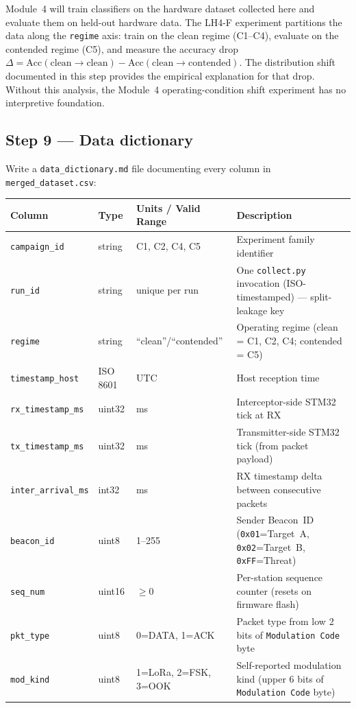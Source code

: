 \documentclass[11pt,letterpaper]{article}
\begin{document}
\begin{tcolorbox}[infobox={Why Operating-Condition Shift Matters for Module~4}]
	Module~4 will train classifiers on the hardware dataset collected here and evaluate them on held-out hardware data. The LH4-F experiment partitions the data along the \texttt{regime} axis: train on the clean regime (C1--C4), evaluate on the contended regime (C5), and measure the accuracy drop $\Delta = \mathrm{Acc}(\mathrm{clean}\!\to\!\mathrm{clean}) - \mathrm{Acc}(\mathrm{clean}\!\to\!\mathrm{contended})$. The distribution shift documented in this step provides the empirical explanation for that drop. Without this analysis, the Module~4 operating-condition shift experiment has no interpretive foundation.
\end{tcolorbox}

\subsection{Step 9 --- Data dictionary}
Write a \texttt{data\_dictionary.md} file documenting every column in \texttt{merged\_dataset.csv}:

\begin{tabularx}{\textwidth}{l l l X}
	\toprule
	\textbf{Column} & \textbf{Type} & \textbf{Units / Valid Range} & \textbf{Description} \\
	\midrule
	\texttt{campaign\_id} & string & C1, C2, C4, C5 & Experiment family identifier \\
	\texttt{run\_id} & string & unique per run & One \texttt{collect.py} invocation (ISO-timestamped) --- split-leakage key \\
	\texttt{regime} & string & ``clean''/``contended'' & Operating regime (clean = C1, C2, C4; contended = C5) \\
	\texttt{timestamp\_host} & ISO 8601 & UTC & Host reception time \\
	\texttt{rx\_timestamp\_ms} & uint32 & ms & Interceptor-side STM32 tick at RX \\
	\texttt{tx\_timestamp\_ms} & uint32 & ms & Transmitter-side STM32 tick (from packet payload) \\
	\texttt{inter\_arrival\_ms} & int32 & ms & RX timestamp delta between consecutive packets \\
	\texttt{beacon\_id} & uint8 & 1--255 & Sender Beacon~ID (\texttt{0x01}=Target~A, \texttt{0x02}=Target~B, \texttt{0xFF}=Threat) \\
	\texttt{seq\_num} & uint16 & $\geq 0$ & Per-station sequence counter (resets on firmware flash) \\
	\texttt{pkt\_type} & uint8 & 0=DATA, 1=ACK & Packet type from low 2 bits of \texttt{Modulation Code} byte \\
	\texttt{mod\_kind} & uint8 & 1=LoRa, 2=FSK, 3=OOK & Self-reported modulation kind (upper 6 bits of \texttt{Modulation Code} byte) \\
	\bottomrule
\end{tabularx}
\end{document}
